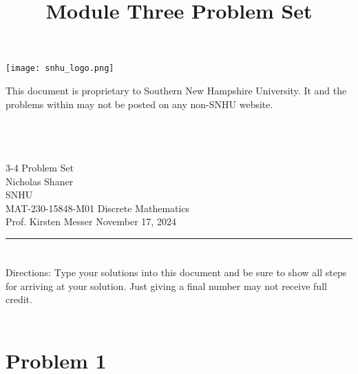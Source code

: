 \documentclass{amsart}
\theoremstyle{definition}
\theoremstyle{Exercise}
\theoremstyle{remark}
\theoremstyle{rule}
\numberwithin{equation}{section}
\begin{document}
\begin{center}
\texttt{[image: snhu\_logo.png]}
\end{center}
\title{\sf Module Three Problem Set}%


\maketitle
This document is proprietary to Southern New Hampshire University. It and the problems within may not be posted on any non-SNHU website.\\\\\\\\
\begin{center}\doublespacing
3-4 Problem Set\\
Nicholas Shaner\\
SNHU\\
MAT-230-15848-M01 Discrete Mathematics\\
Prof. Kirsten Messer
November 17, 2024\\
\end{center}


\begin{center}
\rule{\textwidth}{0.4pt}
\end{center}


\newpage
\section*{}
\section*{}
Directions: Type your solutions into this document and be sure to show all steps for arriving at your solution. Just giving a final number may not receive full credit.
\\\\




\section*{Problem 1}
\end{document}
